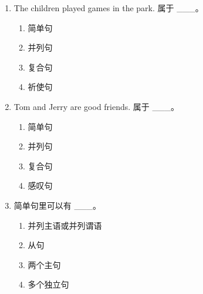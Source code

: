 \documentclass[11pt,a4paper]{ctexart}
\begin{document}
\begin{enumerate}[leftmargin=*,itemsep=4pt]
\begin{enumerate}[label=\Alph*.,leftmargin=2em,itemsep=1pt,topsep=2pt]
\item 复合句
\item 感叹句
\end{enumerate}
\item The children played games in the park. 属于 \_\_\_。
\begin{enumerate}[label=\Alph*.,leftmargin=2em,itemsep=1pt,topsep=2pt]
\item 简单句
\item 并列句
\item 复合句
\item 祈使句
\end{enumerate}
\item Tom and Jerry are good friends. 属于 \_\_\_。
\begin{enumerate}[label=\Alph*.,leftmargin=2em,itemsep=1pt,topsep=2pt]
\item 简单句
\item 并列句
\item 复合句
\item 感叹句
\end{enumerate}
\item 简单句里可以有 \_\_\_。
\begin{enumerate}[label=\Alph*.,leftmargin=2em,itemsep=1pt,topsep=2pt]
\item 并列主语或并列谓语
\item 从句
\item 两个主句
\item 多个独立句
\end{enumerate}
\end{enumerate}
\end{document}
